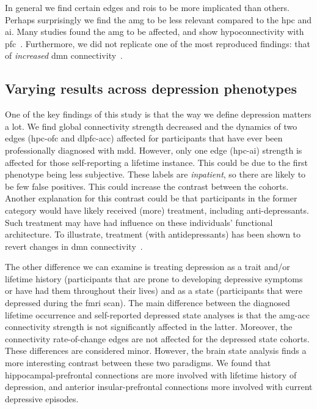 In general we find certain edges and \glspl{roi} to be more implicated than others.
Perhaps surprisingly we find the \gls{amg} to be less relevant compared to the \gls{hpc} and \gls{ai}.
Many studies found the \gls{amg} to be affected, and show hypoconnectivity with \gls{pfc}~\parencite{Dannlowski2009, Burghy2012, Kong2013, Connolly2017}.
Furthermore, we did not replicate one of the most reproduced findings: that of \emph{increased} \gls{dmn} connectivity~\parencite{Kaiser2015, Kaiser2015b, Mulders2015, Kaiser2016}.

\subsection{Varying results across depression phenotypes}
\label{subsec:variation-depression-phenotypes}

One of the key findings of this study is that the way we define depression matters a lot.
We find global connectivity strength decreased and the dynamics of two edges (\gls{hpc}-\gls{ofc} and \gls{dlpfc}-\gls{acc}) affected for participants that have ever been professionally diagnosed with \gls{mdd}.
However, only one edge (\gls{hpc}-\gls{ai}) strength is affected for those self-reporting a lifetime instance.
This could be due to the first phenotype being less subjective.
These labels are \emph{inpatient}, so there are likely to be few false positives.
This could increase the contrast between the cohorts.
%
Another explanation for this contrast could be that participants in the former category would have likely received (more) treatment, including anti-depressants.
Such treatment may have had influence on these individuals' functional architecture.
To illustrate, treatment (with antidepressants) has been shown to revert changes in \gls{dmn} connectivity~\parencite{Liston2014}.

The other difference we can examine is treating depression as a trait and/or lifetime history (participants that are prone to developing depressive symptoms or have had them throughout their lives) and as a state (participants that were depressed during the \gls{fmri} scan).
The main difference between the diagnosed lifetime occurrence and self-reported depressed state analyses is that the \gls{amg}-\gls{acc} connectivity strength is not significantly affected in the latter.
Moreover, the connectivity rate-of-change edges are not affected for the depressed state cohorts.
These differences are considered minor.
However, the brain state analysis finds a more interesting contrast between these two paradigms.
We found that hippocampal-prefrontal connections are more involved with lifetime history of depression, and anterior insular-prefrontal connections more involved with current depressive episodes.


